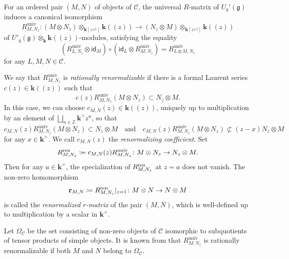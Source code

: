 \documentclass[12pt]{amsart}
\theoremstyle{definition}
\theoremstyle{remark}
\numberwithin{equation}{section}
\begin{document}
For an ordered pair $(M,N)$ of objects of $\mathscr{C}$, the universal $R$-matrix of $U_q'(\mathfrak{g})$ induces a canonical isomorphism 
\[ R_{M,N_z}^{\mathrm{univ}} \colon (M \otimes N_z) \otimes_{\mathbf{k}[z^{\pm 1}]} \mathbf{k}(\!(z)\!) \to (N_z \otimes M) \otimes_{\mathbf{k}[z^{\pm 1}]} \mathbf{k}(\!(z)\!)  \]
of $U'_q(\mathfrak{g}) \otimes_{\mathbf{k}}\mathbf{k}(\!(z)\!)$-modules, satisfying the equality
\begin{equation} \label{eq:q-tri} (R^{\mathrm{univ}}_{L, N_z} \otimes \mathsf{id}_M) \circ (\mathsf{id}_L \otimes R^{\mathrm{univ}}_{M, N_z}) = R^{\mathrm{univ}}_{L \otimes M, N_z}   \end{equation}
for any $L, M,N \in \mathscr{C}$.


We say that $R_{M,N_z}^{\mathrm{univ}}$ is {\em rationally renormalizable} if there is a formal Laurent series $c(z) \in \mathbf{k}(\!(z)\!)$ such that \[c(z)R^{\mathrm{univ}}_{M,N_z}(M \otimes N_z) \subset N_z\otimes M.\]
In this case, we can choose $c_{M,N}(z) \in \mathbf{k}(\!(z)\!)$, uniquely up to multiplication by an element of $\bigsqcup_{n \in \mathbb{Z}}\mathbf{k}^\times z^n$, so that 
\[c_{M,N}(z) R^{\mathrm{univ}}_{M,N_z}(M \otimes N_z) \subset N_z\otimes M \quad \text{and} \quad c_{M,N}(z) R^{\mathrm{univ}}_{M,N_z}(M \otimes N_z)  \not \subset (z-x) N_z \otimes M\]
for any $x \in \mathbf{k}^\times$.
We call $c_{M,N}(z)$ the {\em renormalizing coefficient}. Set \[R_{M,N_z}^{\rm ren} \coloneqq   c_{M,N}(z) R^{\mathrm{univ}}_{M,N_z}\colon M\otimes N_z\rightarrow N_z\otimes M.\] Then for any $a\in \mathbf{k}^\times$, the specialization of $R_{M,N_z}^{\rm ren}$ at $z=a$ does not vanish. 
The non-zero homomorphism
\[{\bf r}_{M,N} \coloneqq   R_{M,N_z}^{\rm ren}|_{z=1} \colon M\otimes N\rightarrow N\otimes M\] 
is called the {\em renormalized $r$-matrix} of the pair $(M,N)$, which is well-defined up to multiplication by a scalar in $\mathbf{k}^\times$.

Let $\Omega_{\mathscr{C}}$ be the set consisting of non-zero objects of $\mathscr{C}$ isomorphic to subquotients of tensor products of simple objects.
It is known from \cite[Propositions 2.11 \& 2.12]{kkop-2020} that $R_{M,N_z}^{\mathrm{univ}}$ is rationally renormalizable if both $M$ and $N$ belong to $\Omega_{\mathscr{C}}$.
\end{document}
